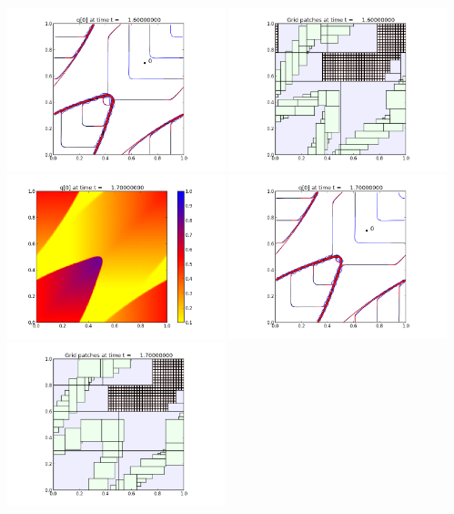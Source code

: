 \documentclass[11pt]{article}
\begin{document}
\includegraphics[width=0.475\textwidth]{frame0016fig1.png}
\vskip 10pt 
\includegraphics[width=0.475\textwidth]{frame0016fig2.png}
\vskip 10pt 
\includegraphics[width=0.475\textwidth]{frame0017fig0.png}
\includegraphics[width=0.475\textwidth]{frame0017fig1.png}
\vskip 10pt 
\includegraphics[width=0.475\textwidth]{frame0017fig2.png}
\end{document}
